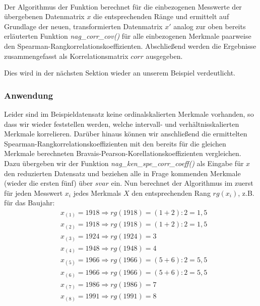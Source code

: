 \\

\noindent Der Algorithmus der Funktion berechnet für die einbezogenen Messwerte der übergebenen Datenmatrix $x$ die entsprechenden Ränge und ermittelt auf Grundlage der neuen, transformierten Datenmatrix $x'$ analog zur oben bereits erläuterten Funktion {\it nag\_corr\_cov()} für alle einbezogenen Merkmale paarweise den Spearman-Rangkorrelationskoeffizienten. Abschließend werden die Ergebnisse zusammengefasst als Korrelationsmatrix $corr$ ausgegeben.

Dies wird in der nächsten Sektion wieder an unserem Beispiel verdeutlicht.

\subsubsection{Anwendung}

Leider sind im Beispieldatensatz keine ordinalskalierten Merkmale vorhanden, so dass wir wieder feststellen werden, welche intervall- und verhältnisskalierten Merkmale korrelieren. Darüber hinaus können wir anschließend die ermittelten Spearman-Rangkorrelationskoeffizienten mit den bereits für die gleichen Merkmale berechneten Bravais-Pearson-Korellationskoeffizienten vergleichen. Dazu übergeben wir der Funktion {\it nag\_ken\_spe\_corr\_coeff()} als Eingabe für $x$ den reduzierten Datensatz und beziehen alle in Frage kommenden Merkmale (wieder die ersten fünf) über $svar$ ein. Nun berechnet der Algorithmus im zuerst für jeden Messwert $x_i$ jedes Merkmals $X$ den entsprechenden Rang $rg(x_i)$, z.B. für das Baujahr:
\begin{equation*}
	\begin{split}
		& x_{(1)}=1918 \Rightarrow rg(1918)=(1+2):2=1,5\\
		& x_{(2)}=1918 \Rightarrow rg(1918)=(1+2):2=1,5\\
		& x_{(3)}=1924 \Rightarrow rg(1924)=3\\
		& x_{(4)}=1948 \Rightarrow rg(1948)=4\\
		& x_{(5)}=1966 \Rightarrow rg(1966)=(5+6):2=5,5\\
		& x_{(6)}=1966 \Rightarrow rg(1966)=(5+6):2=5,5\\
		& x_{(7)}=1986 \Rightarrow rg(1986)=7\\
		& x_{(8)}=1991 \Rightarrow rg(1991)=8
	\end{split}
\end{equation*}

